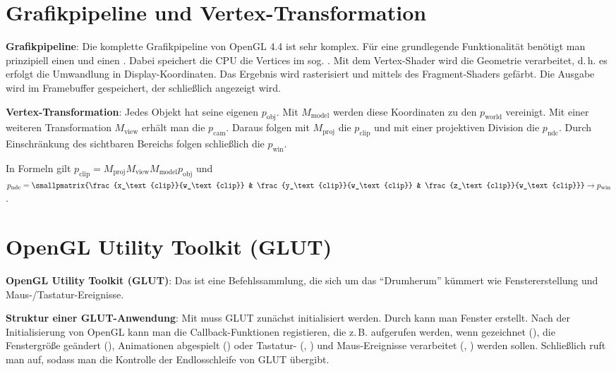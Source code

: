 \section{%
    Grafikpipeline und Vertex-Transformation%
}

\textbf{Grafikpipeline}:
Die komplette Grafikpipeline von OpenGL 4.4 ist sehr komplex.
Für eine grundlegende Funktionalität benötigt man prinzipiell einen
 und einen .
Dabei speichert die CPU die Vertices im sog. .
Mit dem Vertex-Shader wird die Geometrie verarbeitet, d.\,h. es erfolgt die Umwandlung in
Display-Koordinaten.
Das Ergebnis wird rasterisiert und mittels des Fragment-Shaders gefärbt.
Die Ausgabe wird im Framebuffer gespeichert, der schließlich angezeigt wird.

\textbf{Vertex-Transformation}:
Jedes Objekt hat seine eigenen  $p_\text{obj}$.
Mit $M_\text{model}$ werden diese Koordinaten zu den  $p_\text{world}$
vereinigt.
Mit einer weiteren Transformation $M_\text{view}$ erhält man die 
$p_\text{cam}$.
Daraus folgen mit $M_\text{proj}$ die  $p_\text{clip}$
und mit einer projektiven Division die  $p_\text{ndc}$.
Durch Einschränkung des sichtbaren Bereichs folgen schließlich die 
$p_\text{win}$.

In Formeln gilt $p_\text{clip} = M_\text{proj} M_\text{view} M_\text{model} p_\text{obj}$ und
$p_\text{ndc} = \smallpmatrix{\frac{x_\text{clip}}{w_\text{clip}} &
\frac{y_\text{clip}}{w_\text{clip}} & \frac{z_\text{clip}}{w_\text{clip}}} \to p_\text{win}$.

\pagebreak

\section{%
    OpenGL Utility Toolkit (GLUT)%
}

\textbf{OpenGL Utility Toolkit (GLUT)}:
Das  ist eine Befehlssammlung, die sich um das
"`Drumherum"' kümmert wie Fenstererstellung und Maus-/Tastatur-Ereignisse.

\textbf{Struktur einer GLUT-Anwendung}:
Mit  muss GLUT zunächst initialisiert werden.
Durch  kann man Fenster erstellt.
Nach der Initialisierung von OpenGL kann man die Callback-Funktionen registieren,
die z.\,B. aufgerufen werden, wenn
gezeichnet (),
die Fenstergröße geändert (),
Animationen abgespielt () oder
Tastatur- (, ) und
Maus-Ereignisse verarbeitet (, ) werden sollen.
Schließlich ruft man  auf, sodass man die Kontrolle der Endlosschleife von
GLUT übergibt.

